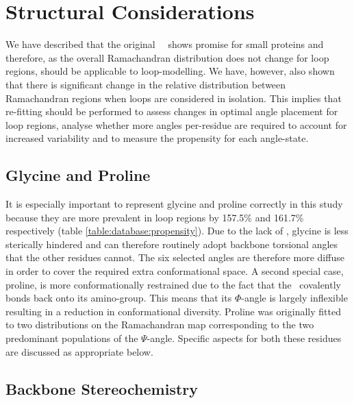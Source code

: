 \section{Structural Considerations}

We have described that the original \raft\ \angleset\ shows promise for small proteins and therefore, as the overall Ramachandran distribution does not change for loop regions, should be applicable to loop-modelling. We have, however, also shown that there is significant change in the relative distribution between Ramachandran regions when loops are considered in isolation. This implies that re-fitting should be performed to assess changes in optimal angle placement for loop regions, analyse whether more angles per-residue are required to account for increased variability and to measure the propensity for each angle-state.

\subsection{Glycine and Proline}

It is especially important to represent glycine and proline correctly in this study because they are more prevalent in loop regions by 157.5\% and 161.7\% respectively (table \ref{table:database:propensity}).
Due to the lack of \sidechain, glycine is less sterically hindered and can therefore routinely adopt backbone torsional angles that the other residues cannot. The six selected angles are therefore more diffuse in order to cover the required extra conformational space. A second special case, proline, is more conformationally restrained due to the fact that the \sidechain\ covalently bonds back onto its amino-group. This means that its $\Phi$-angle is largely inflexible resulting in a reduction in conformational diversity. Proline was originally fitted to two distributions on the Ramachandran map corresponding to the two predominant populations of the $\Psi$-angle. Specific aspects for both these residues are discussed as appropriate below.

\subsection{Backbone Stereochemistry}

